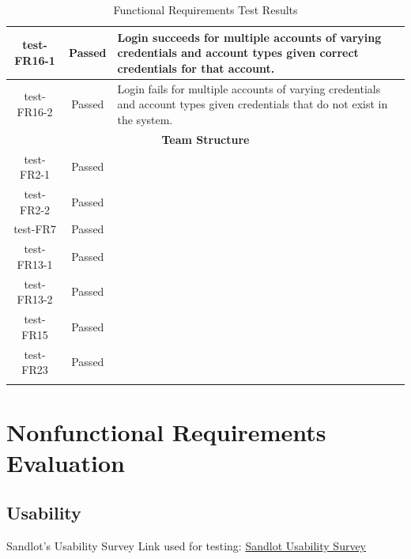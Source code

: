 \documentclass[12pt, titlepage]{article}
\begin{document}
\begin{longtable}{|c|c|p{8cm}|}
  \hline
  test-FR16-1 & Passed & Login succeeds for multiple accounts of varying credentials and account types given correct credentials for that account.\\
  \hline
  test-FR16-2 & Passed & Login fails for multiple accounts of varying credentials and account types given credentials that do not exist in the system.\\
  \hline
  \multicolumn{3}{|c|}{\textbf{Team Structure}} \\
  \hline
  test-FR2-1 & Passed & \\
  \hline
  test-FR2-2 & Passed & \\
  \hline
  test-FR7 & Passed & \\
  \hline
  test-FR13-1 & Passed & \\
  \hline
  test-FR13-2 & Passed & \\
  \hline
  test-FR15 & Passed & \\
  \hline
  test-FR23 & Passed & \\
  \hline
  \caption{Functional Requirements Test Results}
\end{longtable}


\section{Nonfunctional Requirements Evaluation}

\subsection{Usability}

Sandlot's Usability Survey Link used for testing: \href{https://forms.office.com/Pages/ResponsePage.aspx?id=B2M3RCm0rUKMJSjNSW9HcodvkeIlB8lOjrmyIWuVT7dUQ0hBNFRVTjFHWVhITDIzSklZRDRYTVZRMi4u}{Sandlot Usability Survey}
\end{document}

